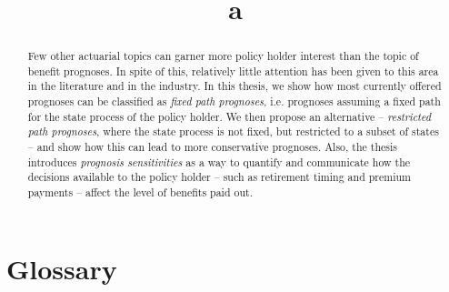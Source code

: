 \documentclass{article}
\title{a} %
\newcommand{\1}[1]{\mathbbm{1}_{\left\lbrace #1 \right\rbrace}}
\theoremstyle{break}
\theoremstyle{remark}
\numberwithin{equation}{section}
\begin{document}
\maketitle

\begin{abstract}
	Few other actuarial topics can garner more policy holder interest than the topic of benefit prognoses. In spite of this, relatively little attention has been given to this area in the literature and in the industry. In this thesis, we show how most currently offered prognoses can be classified as \textit{fixed path prognoses}, i.e. prognoses assuming a fixed path for the state process of the policy holder. We then propose an alternative -- \textit{restricted path prognoses}, where the state process is not fixed, but restricted to a subset of states -- and show how this can lead to more conservative prognoses. Also, the thesis introduces \textit{prognosis sensitivities} as a way to quantify and communicate how the decisions available to the policy holder -- such as retirement timing and premium payments -- affect the level of benefits paid out.
\end{abstract}

\newpage

\tableofcontents 

\newpage

\section{Glossary}
\end{document}
